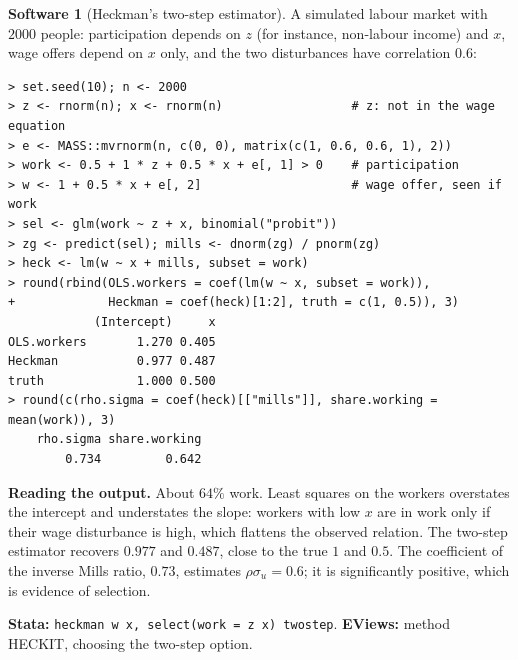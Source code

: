 \documentclass[11pt,a4paper]{article}
\numberwithin{equation}{section}
\theoremstyle{definition}
\newtheorem{software}[thm]{Software}
\begin{document}
\begin{software}[Heckman's two-step estimator]
\label{sw:heckman}
A simulated labour market with $2000$ people: participation depends on $z$ (for instance, non-labour income) and $x$, wage offers depend on $x$ only, and the
two disturbances have correlation $0.6$:
{\small\begin{verbatim}
> set.seed(10); n <- 2000
> z <- rnorm(n); x <- rnorm(n)                  # z: not in the wage equation
> e <- MASS::mvrnorm(n, c(0, 0), matrix(c(1, 0.6, 0.6, 1), 2))
> work <- 0.5 + 1 * z + 0.5 * x + e[, 1] > 0    # participation
> w <- 1 + 0.5 * x + e[, 2]                     # wage offer, seen if work
> sel <- glm(work ~ z + x, binomial("probit"))
> zg <- predict(sel); mills <- dnorm(zg) / pnorm(zg)
> heck <- lm(w ~ x + mills, subset = work)
> round(rbind(OLS.workers = coef(lm(w ~ x, subset = work)),
+             Heckman = coef(heck)[1:2], truth = c(1, 0.5)), 3)
            (Intercept)     x
OLS.workers       1.270 0.405
Heckman           0.977 0.487
truth             1.000 0.500
> round(c(rho.sigma = coef(heck)[["mills"]], share.working = mean(work)), 3)
    rho.sigma share.working 
        0.734         0.642 
\end{verbatim}}
\textbf{Reading the output.} About $64\%$ work. Least squares on the workers overstates the intercept and understates the slope: workers with low $x$ are in work only
if their wage disturbance is high, which flattens the observed relation. The two-step estimator recovers $0.977$ and $0.487$, close to the true $1$ and $0.5$. The
coefficient of the inverse Mills ratio, $0.73$, estimates $\rho\sigma_u = 0.6$; it is significantly positive, which is evidence of selection.

\textbf{Stata:} \texttt{heckman w x, select(work = z x) twostep}. \textbf{EViews:} method HECKIT, choosing the two-step option.
\end{software}
\end{document}
